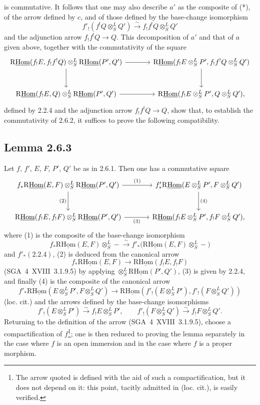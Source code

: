 \documentclass[11pt]{article}
\begin{document}
is commutative. It follows that one may also describe $a'$ as the composite of (*), of the arrow defined by $c$, and of those defined by the base-change isomorphism
\[
f'_!(f^!Q\otimes^L_SQ')\xrightarrow{\sim}f_!f^!Q\otimes^L_SQ'
\]
and the adjunction arrow $f_!f^!Q\to Q$. This decomposition of $a'$ and that of $a$ given above, together with the commutativity of the square
\[
\begin{tikzcd}[column sep=large,row sep=large]
\mathrm{R}\underline{\mathrm{Hom}}(f_!E,f_!f^!Q)\otimes^L_S\mathrm{R}\underline{\mathrm{Hom}}(P',Q') \arrow[r] \arrow[d] & \mathrm{R}\underline{\mathrm{Hom}}(f_!E\otimes^L_SP',f_!f^!Q\otimes^L_SQ') \arrow[d]\\
\mathrm{R}\underline{\mathrm{Hom}}(f_!E,Q)\otimes^L_S\mathrm{R}\underline{\mathrm{Hom}}(P',Q') \arrow[r] & \mathrm{R}\underline{\mathrm{Hom}}(f_!E\otimes^L_SP',Q\otimes^L_SQ'),
\end{tikzcd}
\]
defined by 2.2.4 and the adjunction arrow $f_!f^!Q\to Q$, show that, to establish the commutativity of 2.6.2, it suffices to prove the following compatibility.

\subsection*{Lemma 2.6.3}
Let $f$, $f'$, $E$, $F$, $P'$, $Q'$ be as in 2.6.1. Then one has a commutative square
\[
\begin{tikzcd}[column sep=large,row sep=large]
f_*\mathrm{R}\underline{\mathrm{Hom}}(E,F)\otimes^L_S\mathrm{R}\underline{\mathrm{Hom}}(P',Q') \arrow[r,"(1)"] \arrow[d,"(2)"'] & f'_*\mathrm{R}\underline{\mathrm{Hom}}(E\otimes^L_SP',F\otimes^L_SQ') \arrow[d,"(4)"]\\
\mathrm{R}\underline{\mathrm{Hom}}(f_!E,f_!F)\otimes^L_S\mathrm{R}\underline{\mathrm{Hom}}(P',Q') \arrow[r,"(3)"'] & \mathrm{R}\underline{\mathrm{Hom}}(f_!E\otimes^L_SP',f_!F\otimes^L_SQ'),
\end{tikzcd}
\]
where (1) is the composite of the base-change isomorphism
\[
f_*\mathrm{R}\underline{\mathrm{Hom}}(E,F)\otimes^L_S -\xrightarrow{\sim}f'_*\bigl(\mathrm{R}\underline{\mathrm{Hom}}(E,F)\otimes^L_S-\bigr)
\]
and $f'_*(2.2.4)$, (2) is deduced from the canonical arrow
\[
f_*\mathrm{R}\underline{\mathrm{Hom}}(E,F)\longrightarrow\mathrm{R}\underline{\mathrm{Hom}}(f_!E,f_!F)
\]
(SGA~4~XVIII~3.1.9.5) by applying $\otimes^L_S\mathrm{R}\underline{\mathrm{Hom}}(P',Q')$, (3) is given by 2.2.4, and finally (4) is the composite of the canonical arrow
\[
f'_*\mathrm{R}\underline{\mathrm{Hom}}(E\otimes^L_SP',F\otimes^L_SQ')
\longrightarrow
\mathrm{R}\underline{\mathrm{Hom}}(f'_!(E\otimes^L_SP'),f'_!(F\otimes^L_SQ'))
\]
(loc. cit.) and the arrows defined by the base-change isomorphisms
\[
f'_!(E\otimes^L_SP')\xrightarrow{\sim}f_!E\otimes^L_SP',
\qquad
f'_!(F\otimes^L_SQ')\xrightarrow{\sim}f_!F\otimes^L_SQ'.
\]
Returning to the definition of the arrow (SGA~4~XVIII~3.1.9.5), choose a compactification of $f$\footnote{The arrow quoted is defined with the aid of such a compactification, but it does not depend on it: this point, tacitly admitted in (loc. cit.), is easily verified.}; one is then reduced to proving the lemma separately in the case where $f$ is an open immersion and in the case where $f$ is a proper morphism.
\end{document}
